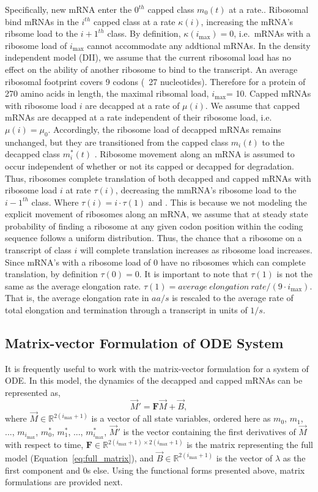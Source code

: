 \documentclass[review]{elsarticle}
\newcommand{\imax}{\ensuremath{{i_{\max}}}\xspace}
\let\bs\boldsymbol
\begin{document}
Specifically, new mRNA enter the $0^{th}$ capped class $m_0(t)$ at a rate..
Ribosomal bind mRNAs in the $i^{th}$ capped class at a rate $\kappa(i)$, increasing the mRNA's ribsome load to the $i+1^{th}$ class.
By definition, $\kappa(\imax)= 0$, i.e.~mRNAs with a ribosome load of \imax cannot accommodate any addtional mRNAs.
In the density independent model (DII), we assume that the current ribosomal load has no effect on the ability of another ribosome to bind to the transcript. 
An average ribosomal footprint covers 9 codons (~27 nucleotides). Therefore for a protein of 270 amino acids in length, the maximal ribsomal load, \imax = 10.
Capped mRNAs with ribosome load $i$ are decapped at a rate of $\mu(i)$.
We assume that capped mRNAs are decapped at a rate independent of their ribosome load, i.e. $\mu(i)=\mu_0$.
Accordingly, the ribosome load of decapped mRNAs remains unchanged, but they are transitioned from the capped class $m_i(t)$ to the decapped class $m_i^*(t)$ .
Ribosome movement along an mRNA is assumed to occur independent of whether or not its capped or decapped for degradation.
Thus, ribosomes complete translation of both decapped and capped mRNAs with ribosome load $i$ at rate $\tau(i)$, decreasing the mmRNA's ribosome load to the $i-1^{th}$ class. %
Where $\tau(i)= i \cdot \tau(1)$ and .
This is because we not modeling the explicit movement of ribosomes along an mRNA, we assume that at steady state probability of finding a ribosome at any given codon position within the coding sequence follows a uniform distribution.
Thus, the chance that a ribosome on a transcript of class $i$ will complete translation increases as ribosome load increases.  
Since mRNA's with a ribosome load of 0 have no ribosomes which can complete translation, by definition $\tau(0) = 0$.
It is important to note that $\tau(1)$ is not the same as the average elongation rate. $\tau(1) = average \: elongation \: rate/(9 \cdot \imax)$. 
That is, the average elongation rate in $aa/s$ is rescaled to the average rate of total elongation and termination through a transcript in units of $1/s$.


\subsection{Matrix-vector Formulation of ODE System}
It is frequently useful to work with the matrix-vector formulation for a system of ODE.
In this model, the dynamics of the decapped and capped mRNAs can be represented as,
\begin{equation}
\vec{M}'=\boldsymbol{F}\vec{M}+\vec{B},
\end{equation} 
where $\vec{M}\in\mathbb{R}^{2(\imax+1)}$ is a vector of all state variables, ordered here as $m_0$, $m_1$, ..., $m_{\imax}$, $m^*_0$, $m^*_1$, ..., $m^*_{\imax}$, $\vec{M}'$ is the vector containing the first derivatives of $\vec{M}$ with respect to time, $\bs{F}\in\mathbb{R}^{2(\imax+1)\times 2(\imax+1)}$ is the matrix representing the full model (Equation~\ref{eq:full_matrix}), and $\vec{B}\in\mathbb{R}^{2(\imax+1)}$ is the vector of $\lambda$ as the first component and 0s else.
Using the functional forms presented above, matrix formulations are provided next.
\end{document}
